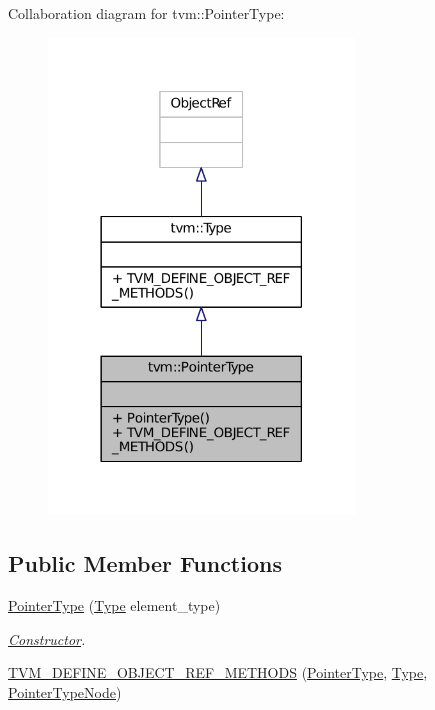 Collaboration diagram for tvm\+:\+:Pointer\+Type\+:
\nopagebreak
\begin{figure}[H]
\begin{center}
\leavevmode
\includegraphics[width=230pt]{classtvm_1_1PointerType__coll__graph}
\end{center}
\end{figure}
\subsection*{Public Member Functions}
\begin{DoxyCompactItemize}
\item 
\hyperlink{classtvm_1_1PointerType_a13d008891daa4ef45a9d22387ad6227f}{Pointer\+Type} (\hyperlink{classtvm_1_1Type}{Type} element\+\_\+type)
\begin{DoxyCompactList}\small\item\em \hyperlink{classtvm_1_1Constructor}{Constructor}. \end{DoxyCompactList}\item 
\hyperlink{classtvm_1_1PointerType_abd62ac0b63821a91e4ed4946a1c7f941}{T\+V\+M\+\_\+\+D\+E\+F\+I\+N\+E\+\_\+\+O\+B\+J\+E\+C\+T\+\_\+\+R\+E\+F\+\_\+\+M\+E\+T\+H\+O\+DS} (\hyperlink{classtvm_1_1PointerType}{Pointer\+Type}, \hyperlink{classtvm_1_1Type}{Type}, \hyperlink{classtvm_1_1PointerTypeNode}{Pointer\+Type\+Node})
\end{DoxyCompactItemize}


